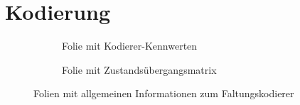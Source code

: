 \section{Kodierung}
\label{kapitel:visualisierung_kodierung}
\begin{figure}[t]
	\centering
	\begin{subfigure}{0.48\textwidth}
		\centering
		\caption{Folie mit Kodierer-Kennwerten}
		\label{abb:folie_kodierer_kennwerte}
	\end{subfigure}
	\quad %
	\begin{subfigure}{0.48\textwidth}
		\centering
		\caption{Folie mit Zustandsübergangsmatrix}
		\label{abb:folie_zustandsübergangsmatrix}
	\end{subfigure}
	\caption{Folien mit allgemeinen Informationen zum Faltungskodierer}
	\label{abb:folie_allg_info_kodierer}
\end{figure}
